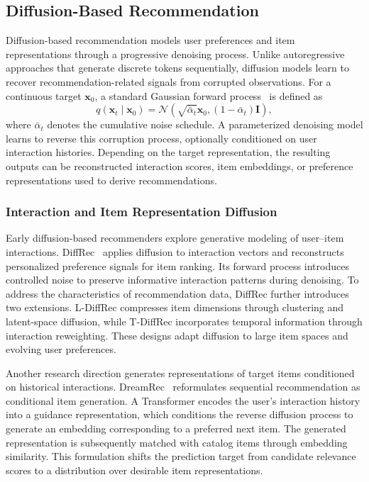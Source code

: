 \documentclass[sigconf,nonacm]{acmart}
\begin{document}
\subsection{Diffusion-Based Recommendation}
\label{sec:diffusion}

Diffusion-based recommendation models user preferences and
item representations through a progressive denoising process.
Unlike autoregressive approaches that generate discrete
tokens sequentially, diffusion models learn to recover
recommendation-related signals from corrupted observations.
For a continuous target $\mathbf{x}_0$, a standard Gaussian
forward process~\cite{ddpm} is defined as
\begin{equation}
    q(\mathbf{x}_t \mid \mathbf{x}_0)
    =
    \mathcal{N}\left(
    \sqrt{\bar{\alpha}_t}\mathbf{x}_0,
    (1-\bar{\alpha}_t)\mathbf{I}
    \right),
    \label{eq:diffusion_forward}
\end{equation}
where $\bar{\alpha}_t$ denotes the cumulative noise
schedule. A parameterized denoising model learns to
reverse this corruption process, optionally conditioned
on user interaction histories. Depending on the target
representation, the resulting outputs can be reconstructed
interaction scores, item embeddings, or preference
representations used to derive recommendations.

\subsubsection{Interaction and Item Representation Diffusion}

Early diffusion-based recommenders explore generative
modeling of user--item interactions. DiffRec~\cite{diffrec}
applies diffusion to interaction vectors and reconstructs
personalized preference signals for item ranking.
Its forward process introduces controlled noise to
preserve informative interaction patterns during
denoising. To address the characteristics of
recommendation data, DiffRec further introduces
two extensions. L-DiffRec compresses item dimensions
through clustering and latent-space diffusion,
while T-DiffRec incorporates temporal information
through interaction reweighting. These designs
adapt diffusion to large item spaces and evolving
user preferences.

Another research direction generates representations
of target items conditioned on historical interactions.
DreamRec~\cite{dreamrec} reformulates sequential
recommendation as conditional item generation.
A Transformer encodes the user's interaction history
into a guidance representation, which conditions the
reverse diffusion process to generate an embedding
corresponding to a preferred next item. The generated
representation is subsequently matched with catalog
items through embedding similarity. This formulation
shifts the prediction target from candidate relevance
scores to a distribution over desirable item
representations.
\end{document}

